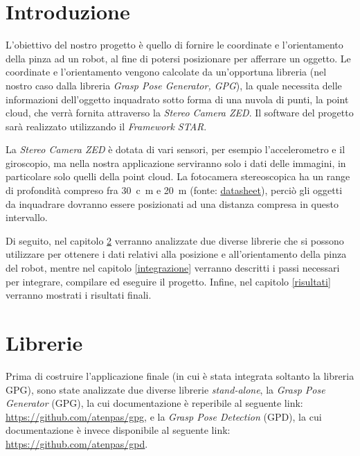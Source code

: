 \documentclass{report}
\begin{document}
\chapter{Introduzione}
L'obiettivo del nostro progetto è quello di fornire le coordinate e l'orientamento della pinza ad un robot, al fine di potersi posizionare per afferrare un oggetto. Le coordinate e l'orientamento vengono calcolate da un'opportuna libreria (nel nostro caso dalla libreria \textit{Grasp Pose Generator, GPG}), la quale necessita delle informazioni dell'oggetto inquadrato sotto forma di una nuvola di punti, la point cloud, che verrà fornita attraverso la \textit{Stereo Camera ZED}. Il software del progetto sarà realizzato utilizzando il \textit{Framework STAR}. \par
La \textit{Stereo Camera ZED} è dotata di vari sensori, per esempio l'accelerometro e il giroscopio, ma nella nostra applicazione serviranno solo i dati delle immagini, in particolare solo quelli della point cloud. La fotocamera stereoscopica ha un range di profondità compreso fra \SI{30}{c\meter} e \SI{20}{\meter} (fonte: \textcolor{blue}{\underline{\href{https://www.stereolabs.com/assets/datasheets/zed2-camera-datasheet.pdf}{datasheet}}}), perciò gli oggetti da inquadrare dovranno essere posizionati ad una distanza compresa in questo intervallo. \par
Di seguito, nel capitolo \ref{librerie} verranno analizzate due diverse librerie che si possono utilizzare per ottenere i dati relativi alla posizione e all'orientamento della pinza del robot, mentre nel capitolo \ref{integrazione} verranno descritti i passi necessari per integrare, compilare ed eseguire il progetto. Infine, nel capitolo \ref{risultati} verranno mostrati i risultati finali.
\newpage
\chapter{Librerie}\label{librerie}
Prima di costruire l'applicazione finale (in cui è stata integrata soltanto la libreria GPG), sono state analizzate due diverse librerie \textit{stand-alone}, la \textit{Grasp Pose Generator} (GPG), la cui documentazione è reperibile al seguente link: \textcolor{blue}{\underline{\url{https://github.com/atenpas/gpg}}}, e la \textit{Grasp Pose Detection} (GPD), la cui documentazione è invece disponibile al seguente link: \textcolor{blue}{\underline{\url{https://github.com/atenpas/gpd}}}.\par
\end{document}
